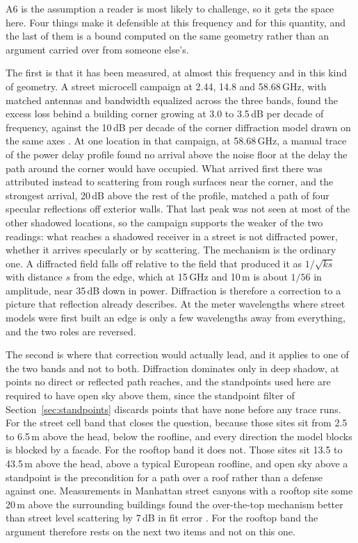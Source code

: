 A6 is the assumption a reader is most likely to challenge, so it gets the space
here. Four things make it defensible at this frequency and for this quantity, and
the last of them is a bound computed on the same geometry rather than an argument
carried over from someone else's.

The first is that it has been measured, at almost this frequency and in this
kind of geometry. A street microcell campaign at 2.44, 14.8 and 58.68\,GHz, with
matched antennas and bandwidth equalized across the three bands, found the
excess loss behind a building corner growing at 3.0 to 3.5\,dB per decade of
frequency, against the 10\,dB per decade of the corner diffraction model drawn
on the same axes \cite{ericsson, mmmagic}. At one location in that campaign, at
58.68\,GHz, a manual trace of the power delay profile found no arrival above the
noise floor at the delay the path around the corner would have occupied. What
arrived first there was attributed instead to scattering from rough surfaces
near the corner, and the strongest arrival, 20\,dB above the rest of the
profile, matched a path of four specular reflections off exterior walls. That
last peak was not seen at most of the other shadowed locations, so the campaign
supports the weaker of the two readings: what reaches a shadowed receiver in a
street is not diffracted power, whether it arrives specularly or by scattering.
The mechanism is the ordinary one. A diffracted
field falls off relative to the field that produced it as $1/\sqrt{ks}$ with
distance $s$ from the edge, which at 15\,GHz and 10\,m is about $1/56$ in
amplitude, near 35\,dB down in power. Diffraction is therefore a correction to a
picture that reflection already describes. At the meter wavelengths where street
models were first built an edge is only a few wavelengths away from everything,
and the two roles are reversed.

The second is where that correction would actually lead, and it applies to one of
the two bands and not to both. Diffraction dominates only in deep shadow, at
points no direct or reflected path reaches, and the standpoints used here are
required to have open sky above them, since the standpoint filter of
Section~\ref{sec:standpoints} discards points that have none before any trace
runs. For the street cell band that closes the question, because
those sites sit from 2.5 to 6.5\,m above the head, below the roofline, and every
direction the model blocks is blocked by a facade. For the rooftop band it does
not. Those sites sit 13.5 to 43.5\,m above the head, above a typical European
roofline, and open sky above a standpoint is the precondition for a path over a
roof rather than a defense against one. Measurements in Manhattan street canyons
with a rooftop site some 20\,m above the surrounding buildings found the
over-the-top mechanism better than street level scattering by 7\,dB in fit error
\cite{adhikari}. For the rooftop band the argument therefore rests on the next
two items and not on this one.

